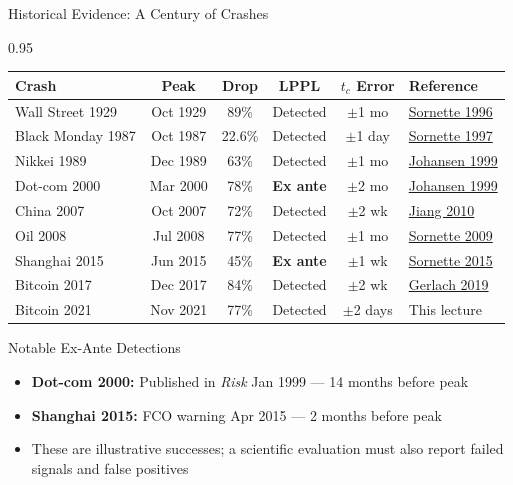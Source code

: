 \documentclass[9pt, aspectratio=169, t]{beamer}
\begin{document}
\begin{frame}{Historical Evidence: A Century of Crashes}
    \begin{cminipage}{0.95\textwidth}
    {\scriptsize
    \begin{center}
        \begin{tabular}{lccccl}
            \toprule
            \textbf{Crash} & \textbf{Peak} & \textbf{Drop} & \textbf{LPPL} & \textbf{$t_c$ Error} & \textbf{Reference} \\
            \midrule
            Wall Street 1929 & Oct 1929 & 89\% & Detected & $\pm$1 mo & \href{https://doi.org/10.1051/jp1:1996243}{Sornette 1996} \\
            Black Monday 1987 & Oct 1987 & 22.6\% & Detected & $\pm$1 day & \href{https://doi.org/10.1016/S0378-4371(97)00318-X}{Sornette 1997} \\
            Nikkei 1989 & Dec 1989 & 63\% & Detected & $\pm$1 mo & \href{https://doi.org/10.48550/arXiv.cond-mat/9903321}{Johansen 1999} \\
            Dot-com 2000 & Mar 2000 & 78\% & \textbf{Ex ante} & $\pm$2 mo & \href{https://doi.org/10.48550/arXiv.cond-mat/9903321}{Johansen 1999} \\
            China 2007 & Oct 2007 & 72\% & Detected & $\pm$2 wk & \href{https://doi.org/10.1016/j.physa.2009.12.022}{Jiang 2010} \\
            Oil 2008 & Jul 2008 & 77\% & Detected & $\pm$1 mo & \href{https://doi.org/10.1016/j.physa.2008.12.050}{Sornette 2009} \\
            Shanghai 2015 & Jun 2015 & 45\% & \textbf{Ex ante} & $\pm$1 wk & \href{https://doi.org/10.1142/S2010139215500044}{Sornette 2015} \\
            Bitcoin 2017 & Dec 2017 & 84\% & Detected & $\pm$2 wk & \href{https://doi.org/10.1098/rsos.180643}{Gerlach 2019} \\
            Bitcoin 2021 & Nov 2021 & 77\% & Detected & $\pm$2 days & This lecture \\
            \bottomrule
        \end{tabular}
    \end{center}

    \vspace{2mm}
    \begin{exampleblock}{Notable Ex-Ante Detections}
        \begin{itemize}\setlength{\itemsep}{0pt}
            \item \textbf{Dot-com 2000:} Published in \textit{Risk} Jan 1999 --- 14 months before peak
            \item \textbf{Shanghai 2015:} FCO warning Apr 2015 --- 2 months before peak
            \item These are illustrative successes; a scientific evaluation must also report failed signals and false positives
        \end{itemize}
    \end{exampleblock}
    }
    \end{cminipage}
\end{frame}
\end{document}
